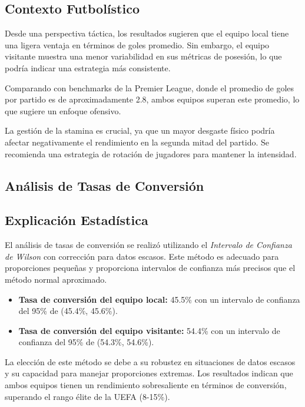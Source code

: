 \documentclass{article}
\begin{document}
    \subsection*{Contexto Futbolístico}
    Desde una perspectiva táctica, los resultados sugieren que el equipo local tiene una ligera ventaja en términos de goles promedio. Sin embargo, el equipo visitante muestra una menor variabilidad en sus métricas de posesión, lo que podría indicar una estrategia más consistente.
    
    Comparando con benchmarks de la Premier League, donde el promedio de goles por partido es de aproximadamente 2.8, ambos equipos superan este promedio, lo que sugiere un enfoque ofensivo.
    
    La gestión de la stamina es crucial, ya que un mayor desgaste físico podría afectar negativamente el rendimiento en la segunda mitad del partido. Se recomienda una estrategia de rotación de jugadores para mantener la intensidad.
    
    \subsection{Análisis de Tasas de Conversión}
        \subsection*{Explicación Estadística}
        El análisis de tasas de conversión se realizó utilizando el \textit{Intervalo de Confianza de Wilson} con corrección para datos escasos. Este método es adecuado para proporciones pequeñas y proporciona intervalos de confianza más precisos que el método normal aproximado.
        
        \begin{itemize}
            \item \textbf{Tasa de conversión del equipo local:} 45.5\% con un intervalo de confianza del 95\% de (45.4\%, 45.6\%).
            \item \textbf{Tasa de conversión del equipo visitante:} 54.4\% con un intervalo de confianza del 95\% de (54.3\%, 54.6\%).
        \end{itemize}
        
        La elección de este método se debe a su robustez en situaciones de datos escasos y su capacidad para manejar proporciones extremas. Los resultados indican que ambos equipos tienen un rendimiento sobresaliente en términos de conversión, superando el rango élite de la UEFA (8-15\%).
        
\end{document}
